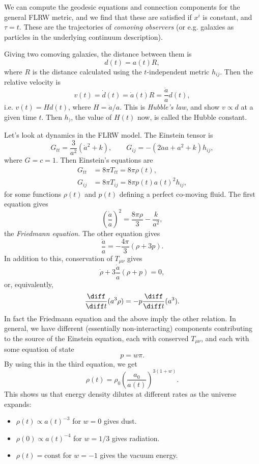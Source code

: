 \documentclass[12pt]{article}
\begin{document}
We can compute the geodesic equations and connection components for the general FLRW metric, and we find that these are satisfied if $x^i$ is constant, and $\tau = t$. These are the trajectories of \emph{comoving observers} (or e.g. galaxies as particles in the underlying continuum description).

Giving two comoving galaxies, the distance between them is
\[
d(t) = a(t) R,
\]
where $R$ is the distance calculated using the $t$-independent metric $h_{ij}$. Then the relative velocity is
\[
v(t) = \dot d(t) = \dot a(t) R = \frac{\dot a}{a} d(t),
\]
i.e. $v(t) = H d(t)$, where $H = \dot a/ a$. This is \emph{Hubble's law}, and show $v \propto d$ at a given time $t$. Then $h_)$, the value of $H(t)$ now, is called the Hubble constant.

Let's look at dynamics in the FLRW model. The Einstein tensor is
\[
G_{tt} = \frac{3}{a^2}(\dot a^2 + k), \qquad G_{ij} = - (2 \ddot a a + a^2 + k) h_{ij},
\]
where $G = c = 1$. Then Einstein's equations are
\begin{align*}
	G_{tt} &= 8 \pi T_{tt} = 8 \pi \rho(t), \\
	G_{ij} &= 8 \pi T_{ij} = 8 \pi p(t) a(t)^2 h_{ij},
\end{align*}
for some functions $\rho(t)$ and $p(t)$ defining a perfect co-moving fluid. The first equation gives
\[
\left( \frac{\dot a}{a} \right)^2= \frac{8 \pi \rho}{3} - \frac{k}{a^2},
\]
the \emph{Friedmann equation}. The other equation gives
\[
\frac{\ddot a}{a} = - \frac{4 \pi}{3} (\rho + 3p).
\]
In addition to this, conservation of $T_{\mu\nu}$ gives
\[
\dot \rho + 3 \frac{\dot a}{a} (\rho + p) = 0,
\]
or, equivalently,
\[
\frac{\diff}{\diff t}(a^3 \rho) = - p \frac{\diff}{\diff t}(a^3).
\]
In fact the Friedmann equation and the above imply the other relation. In general, we have different (essentially non-interacting) components contributing to the source of the Einstein equation, each with conserved $T_{\mu\nu}$, and each with some equation of state
\[
p = w \pi.
\]
By using this in the third equation, we get
\[
\rho(t) = \rho_0 \left( \frac{a_0}{a(t)} \right)^{3(1+w)}.
\]
This shows us that energy density dilutes at different rates as the universe expands:
\begin{itemize}
	\item $\rho(t) \propto a(t)^{-3}$ for $w = 0$ gives dust.
	\item $\rho(0) \propto a(t)^{-4}$ for $w = 1/3$ gives radiation.
	\item $\rho(t) = \text{const}$ for $w = -1$ gives the vacuum energy.
\end{itemize}
\end{document}
